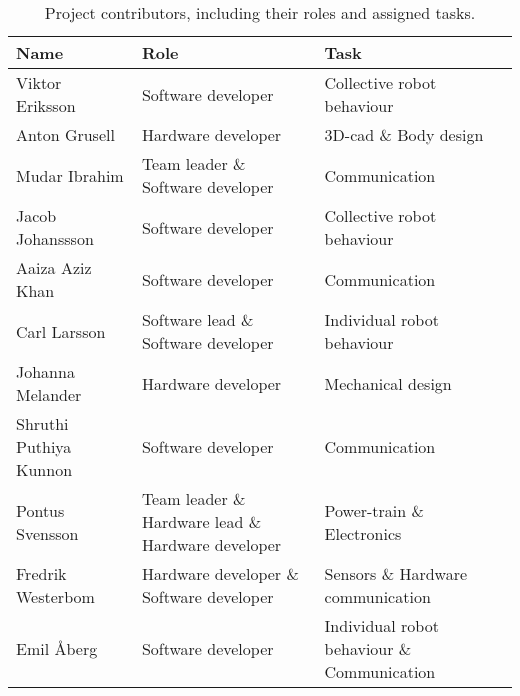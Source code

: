 \begin{table}[H]
    \centering
    \begin{tabularx}{\columnwidth}{|X|X|X|} \hline
         \textbf{Name}          & \textbf{Role}                                         & \textbf{Task}                                 \\ \hline
         Viktor Eriksson        & Software developer                                    & Collective robot behaviour                    \\ \hline
         Anton Grusell          & Hardware developer                                    & 3D-\acs{cad} \& Body design                   \\ \hline
         Mudar Ibrahim          & Team leader \& Software developer                     & Communication                                 \\ \hline
         Jacob Johanssson       & Software developer                                    & Collective robot behaviour                    \\ \hline
         Aaiza Aziz Khan        & Software developer                                    & Communication                                 \\ \hline
         Carl Larsson           & Software lead \& Software developer                   & Individual robot behaviour                    \\ \hline
         Johanna Melander       & Hardware developer                                    & Mechanical design                             \\ \hline
         Shruthi Puthiya Kunnon & Software developer                                    & Communication                                 \\ \hline
         Pontus Svensson        & Team leader \& Hardware lead \& Hardware developer    & Power-train \& Electronics                    \\ \hline
         Fredrik Westerbom      & Hardware developer \& Software developer              & Sensors \& Hardware communication             \\ \hline
         Emil Åberg             & Software developer                                    & Individual robot behaviour \& Communication   \\ \hline
    \end{tabularx}
    \caption{Project contributors, including their roles and assigned tasks.}
    \label{tab:contributors_roles}
\end{table}

